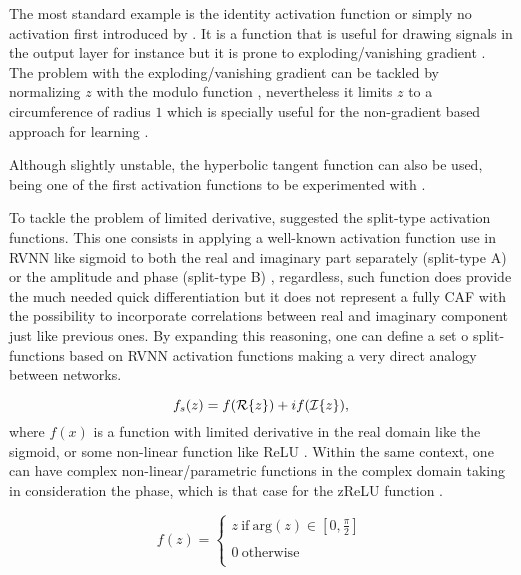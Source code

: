 The most standard example is the identity activation function or simply no activation first introduced by \textcite{widrow1975complex}. It is a function that is useful for drawing signals in the output layer for instance but it is prone to exploding/vanishing gradient \parencite{hirose2012complex}. The problem with the exploding/vanishing gradient can be tackled by normalizing $ z $ with the modulo function \parencite{amari1995information, hirose2012complex}, nevertheless it limits $ z $ to a circumference of radius $ 1 $ which is specially useful for the non-gradient based approach for learning \parencite{bassey2021survey}.

Although slightly unstable, the hyperbolic tangent function can also be used, being one of the first activation functions to be experimented with \parencite{kim2000fully}.

To tackle the problem of limited derivative,  \textcite{benvenuto1992firstback} suggested the split-type activation functions. This one consists in applying a well-known activation function use in RVNN like sigmoid \parencite{cox1958} to both the real and imaginary part separately (split-type A) or the amplitude and phase (split-type B) \parencite{abdalla2023newtheory}, regardless, such function does provide the much needed quick differentiation but it does not represent a fully \gls{CAF} with the possibility to incorporate correlations between real and imaginary component just like previous ones. By expanding this reasoning, one can define a set o split-functions based on RVNN activation functions making a very direct analogy between networks. 

\begin{equation}
	f_s(z) = f(\mathcal{R}\{ z \}) + if(\mathcal{I}\{ z \}),
\end{equation}
where $ f(x) $ is a function with limited derivative in the real domain like the sigmoid, or some non-linear function like ReLU \parencite{glorot2011deep}. Within the same context, one can have complex non-linear/parametric functions in the complex domain taking in consideration the phase, which is that case for the zReLU function \parencite{guberman2016complex}.

\begin{equation}
	f(z) = \begin{cases}
		z \ \text{if} \ \text{arg}(z) \in \left[ 0, \frac{\pi}{2} \right]  \\
		\\
		0 \ \text{otherwise} \\ 
	\end{cases}
\end{equation}

